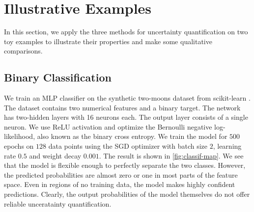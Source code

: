 \section{Illustrative Examples}
\label{sec:exp}

In this section, we apply the three methods for uncertainty quantification on two toy examples to illustrate their properties and make some qualitative comparisons.

\subsection{Binary Classification}
\label{sec:classif}

We train an MLP classifier on the synthetic two-moons dataset from scikit-learn \citep{scikit-learn}. The dataset contains two numerical features and a binary target. The network has two-hidden layers with 16 neurons each. The output layer consists of a single neuron. We use ReLU activation and optimize the Bernoulli negative log-likelihood, also known as the binary cross entropy. We train the model for $500$ epochs on $128$ data points using the SGD optimizer with batch size $2$, learning rate $0.5$ and weight decay $0.001$. The result is shown in \cref{fig:classif-map}. We see that the model is flexible enough to perfectly separate the two classes. However, the predicted probabilities are almost zero or one in most parts of the feature space. Even in regions of no training data, the model makes highly confident predictions. Clearly, the output probabilities of the model themselves do not offer reliable unceratainty quantification.

